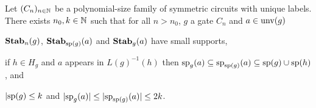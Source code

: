 \documentclass[../paper.tex]{subfiles}
\begin{document}
\begin{lem}
  \label{lem:row-column-supports}
  Let $(C_n)_{n \in \mathbb{N}}$ be a polynomial-size family of symmetric circuits
  with unique labels. There exists $n_0, k \in \mathbb{N}$ such that for all $n >
  n_0$, $g$ a gate $C_n$ and $a \in \text{unv}(g)$
  \begin{myitemize}
  \item $\text{\textbf{Stab}}_n(g)$, $\text{\textbf{Stab}}_{\text{sp}(g)}(a)$ and $\text{\textbf{Stab}}_{g}(a)$ have small
    supports,
  \item if $h \in H_g$ and $a$ appears in $L(g)^{-1}(h)$ then $\text{sp}_g(a)
    \subseteq \text{sp}_{\text{sp}(g)}(a) \subseteq \text{sp}(g) \cup \text{sp}(h)$, and
  \item $\vert \text{sp}(g) \leq k$ and $\vert \text{sp}_g(a) \vert \leq \vert
    \text{sp}_{\text{sp}(g)}(a) \vert \leq 2k$.
  \end{myitemize}

  

\end{lem}
\end{document}
